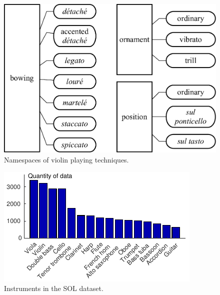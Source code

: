 \begin{figure}
\centering
\includegraphics[width=\linewidth]{technique-dendrogram.pdf}
\caption{Namespaces of violin playing techniques.}
\label{fig:technique-dendrogram}
\end{figure}
\begin{figure}
\centering
\includegraphics[width=0.98\linewidth]{histogram_instruments.pdf}
\caption{Instruments in the SOL dataset.}
\label{fig:instrument-histogram}
\end{figure}
